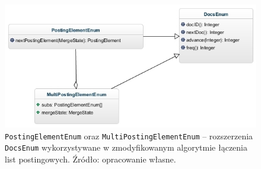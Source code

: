 \begin{figure}[here]
 \includegraphics[scale=0.7]{pictures/PostingEnums.jpg}
 \caption{\texttt{PostingElementEnum} oraz \texttt{MultiPostingElementEnum} -- rozszerzenia \texttt{DocsEnum} wykorzystywane w zmodyfikowanym algorytmie łączenia list postingowych. Źródło: opracowanie własne. \label{fig:postingEnums}}
\end{figure}

